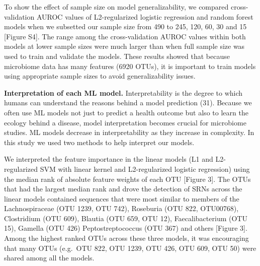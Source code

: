 \documentclass[11pt,]{article}
\begin{document}
To show the effect of sample size on model generalizability, we compared
cross-validation AUROC values of L2-regularized logistic regression and
random forest models when we subsetted our sample size from 490 to 245,
120, 60, 30 and 15 {[}Figure S4{]}. The range among the cross-validation
AUROC values within both models at lower sample sizes were much larger
than when full sample size was used to train and validate the models.
These results showed that because microbiome data has many features
(6920 OTUs), it is important to train models using appropriate sample
sizes to avoid generalizability issues.

\textbf{Interpretation of each ML model.} Interpretability is the degree
to which humans can understand the reasons behind a model prediction
(31). Because we often use ML models not just to predict a health
outcome but also to learn the ecology behind a disease, model
interpretation becomes crucial for microbiome studies. ML models
decrease in interpretability as they increase in complexity. In this
study we used two methods to help interpret our models.

We interpreted the feature importance in the linear models (L1 and
L2-regularized SVM with linear kernel and L2-regularized logistic
regression) using the median rank of absolute feature weights of each
OTU {[}Figure 3{]}. The OTUs that had the largest median rank and drove
the detection of SRNs across the linear models contained sequences that
were most similar to members of the Lachnospiraceae (OTU 1239, OTU 742),
Roseburia (OTU 822, OTU00768), Clostridium (OTU 609), Blautia (OTU 659,
OTU 12), Faecalibacterium (OTU 15), Gamella (OTU 426) Peptostreptococcus
(OTU 367) and others {[}Figure 3{]}. Among the highest ranked OTUs
across these three models, it was encouraging that many OTUs (e.g.~OTU
822, OTU 1239, OTU 426, OTU 609, OTU 50) were shared among all the
models.
\end{document}
